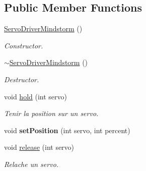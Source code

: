 \subsection*{Public Member Functions}
\begin{DoxyCompactItemize}
\item 
\mbox{\label{classServoDriverMindstorm_aa77ddcd0c679a61dd5377d23ba3485d3}} 
\hyperlink{classServoDriverMindstorm_aa77ddcd0c679a61dd5377d23ba3485d3}{Servo\+Driver\+Mindstorm} ()
\begin{DoxyCompactList}\small\item\em Constructor. \end{DoxyCompactList}\item 
\mbox{\label{classServoDriverMindstorm_aeba90a3b4e50574bebbd70935119d1c7}} 
\hyperlink{classServoDriverMindstorm_aeba90a3b4e50574bebbd70935119d1c7}{$\sim$\+Servo\+Driver\+Mindstorm} ()
\begin{DoxyCompactList}\small\item\em Destructor. \end{DoxyCompactList}\item 
\mbox{\label{classServoDriverMindstorm_af751a007e6e663242c23b16de784249c}} 
void \hyperlink{classServoDriverMindstorm_af751a007e6e663242c23b16de784249c}{hold} (int servo)
\begin{DoxyCompactList}\small\item\em Tenir la position sur un servo. \end{DoxyCompactList}\item 
\mbox{\label{classServoDriverMindstorm_a30442d2a4069bfc996844d7b6b390188}} 
void {\bfseries set\+Position} (int servo, int percent)
\item 
\mbox{\label{classServoDriverMindstorm_af5f7834ab7246970e918e71aead2cfde}} 
void \hyperlink{classServoDriverMindstorm_af5f7834ab7246970e918e71aead2cfde}{release} (int servo)
\begin{DoxyCompactList}\small\item\em Relache un servo. \end{DoxyCompactList}\item 
\mbox{\label{classServoDriverMindstorm_a0ba2fb2410c22645e68bab76ab4921ac}} 

\end{DoxyCompactItemize}
